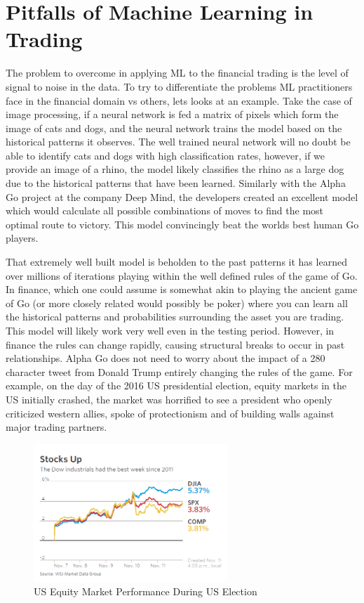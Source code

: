 \documentclass[12pt, a4paper]{article}
\begin{document}
\section{Pitfalls of Machine Learning in Trading}
The problem to overcome in applying ML to the financial trading is the level of signal to noise in the data. To try to differentiate the problems ML practitioners face in the financial domain vs others, lets looks at an example. Take the case of image processing, if a neural network is fed a matrix of pixels which form the image of cats and dogs, and the neural network trains the model based on the historical patterns it observes. The well trained neural network will no doubt be able to identify cats and dogs with high classification rates, however, if we provide an image of a rhino, the model likely classifies the rhino as a large dog due to the historical patterns that have been learned. \newline Similarly with the Alpha Go project \cite{Silver2016} at the company Deep Mind, the developers created an excellent model which would calculate all possible combinations of moves to find the most optimal route to victory. This model convincingly beat the worlds best human Go players.
\par
That extremely well built model is beholden to the past patterns it has learned over millions of iterations playing within the well defined rules of the game of Go. In finance, which one could assume is somewhat akin to playing the ancient game of Go (or more closely related would possibly be poker) where you can learn all the historical patterns and probabilities surrounding the asset you are trading. This model will likely work very well even in the testing period. However, in finance the rules can change rapidly, causing structural breaks to occur in past relationships. Alpha Go does not need to worry about the impact of a 280 character tweet from Donald Trump entirely changing the rules of the game.\newline 
For example, on the day of the 2016 US presidential election, equity markets in the US initially crashed, the market was horrified to see a president who openly criticized western allies, spoke of protectionism and of building walls against major trading partners. 
\begin{figure}[h]
    \centering
    \includegraphics[width=0.65\textwidth]{ElectionDay}
    \caption{US Equity Market Performance During US Election}
    \label{fig:election}
\end{figure}
\end{document}
